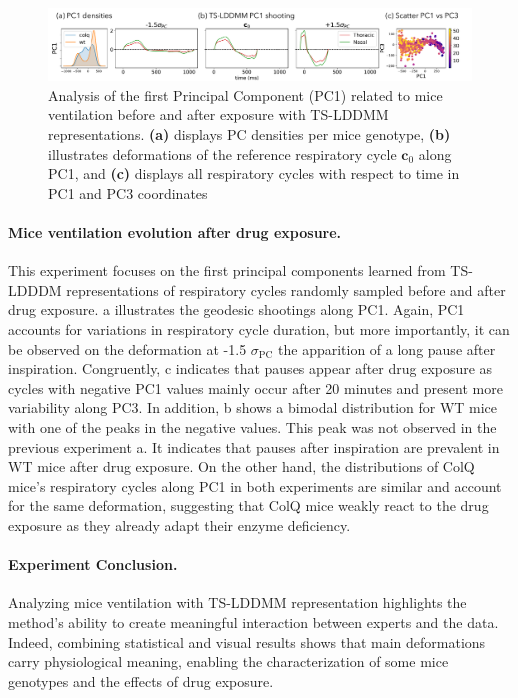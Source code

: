 \begin{figure}[t]
  \centering
  \includegraphics[width=\linewidth]{pictures/exp after/exp after.pdf}
  \caption{Analysis of the first Principal Component (PC1) related to mice ventilation before and after exposure with TS-LDDMM representations. \textbf{(a)} displays PC densities per mice genotype, \textbf{(b)} illustrates deformations of the reference respiratory cycle $\mathbf{c}_0$ along PC1, and \textbf{(c)} displays all respiratory cycles with respect to time in PC1 and PC3 coordinates}
  \label{fig:exp_2_PCA}
  \vspace{-1.5em}
\end{figure}
\vspace{-1ex}

\paragraph{Mice ventilation evolution after drug exposure.} 
This experiment focuses on the first principal components learned from TS-LDDDM representations of respiratory cycles randomly sampled before and after drug exposure. a illustrates the geodesic shootings along PC1. Again, PC1 accounts for variations in respiratory cycle duration, but more importantly, it can be observed on the deformation at -1.5 $\sigma_{\text{PC}}$ the apparition of a long pause after inspiration. Congruently, c indicates that pauses appear after drug exposure as cycles with negative PC1 values mainly occur after 20 minutes and present more variability along PC3. In addition, b shows a bimodal distribution for WT mice with one of the peaks in the negative values. This peak was not observed in the previous experiment a. It indicates that pauses after inspiration are prevalent in WT mice after drug exposure. On the other hand, the distributions of ColQ mice's respiratory cycles along PC1 in both experiments are similar and account for the same deformation, suggesting that ColQ mice weakly react to the drug exposure as they already adapt their enzyme deficiency. 
\vspace{-1ex}

\paragraph{Experiment Conclusion.}
Analyzing mice ventilation with TS-LDDMM representation highlights the method's ability to create meaningful interaction between experts and the data. Indeed, combining statistical and visual results shows that main deformations carry physiological meaning, enabling the characterization of some mice genotypes and the effects of drug exposure. 